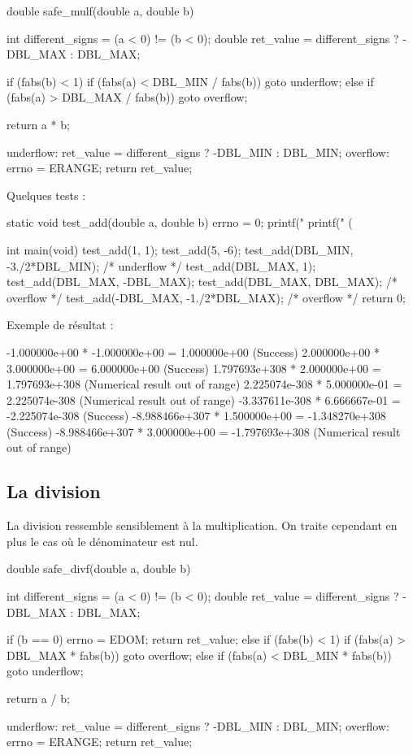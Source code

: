 \begin{C}
double safe_mulf(double a, double b)
{
    int different_signs = (a < 0) != (b < 0);
    double ret_value = different_signs ? -DBL_MAX : DBL_MAX;

    if (fabs(b) < 1) 
    {
        if (fabs(a) < DBL_MIN / fabs(b))
            goto underflow;
    }
    else
    {
        if (fabs(a) > DBL_MAX / fabs(b))
            goto overflow;
    }   

    return a * b;

underflow:
    ret_value = different_signs ? -DBL_MIN : DBL_MIN;
overflow:
    errno = ERANGE;
    return ret_value;
}
\end{C}

Quelques tests :

\begin{C}
static void test_add(double a, double b)
{
    errno = 0;
    printf("%
    printf(" (%
}

int main(void)
{
    test_add(1, 1);
    test_add(5, -6);
    test_add(DBL_MIN, -3./2*DBL_MIN); /* underflow */
    test_add(DBL_MAX, 1);
    test_add(DBL_MAX, -DBL_MAX);
    test_add(DBL_MAX, DBL_MAX); /* overflow */
    test_add(-DBL_MAX, -1./2*DBL_MAX); /* overflow */
    return 0;
}
\end{C}

Exemple de résultat :

\begin{C}
-1.000000e+00 * -1.000000e+00 = 1.000000e+00 (Success)
2.000000e+00 * 3.000000e+00 = 6.000000e+00 (Success)
1.797693e+308 * 2.000000e+00 = 1.797693e+308 (Numerical result out of range)
2.225074e-308 * 5.000000e-01 = 2.225074e-308 (Numerical result out of range)
-3.337611e-308 * 6.666667e-01 = -2.225074e-308 (Success)
-8.988466e+307 * 1.500000e+00 = -1.348270e+308 (Success)
-8.988466e+307 * 3.000000e+00 = -1.797693e+308 (Numerical result out of range)
\end{C}

\subsection{La division}
\label{la-division}

La division ressemble sensiblement à la multiplication. On traite
cependant en plus le cas où le dénominateur est nul.

\begin{C}
double safe_divf(double a, double b)
{
    int different_signs = (a < 0) != (b < 0);
    double ret_value = different_signs ? -DBL_MAX : DBL_MAX;

    if (b == 0)
    {
        errno = EDOM;
        return ret_value;   
    }
    else if (fabs(b) < 1)
    {
        if (fabs(a) > DBL_MAX * fabs(b))
            goto overflow;
    }
    else
    {
        if (fabs(a) < DBL_MIN * fabs(b))
            goto underflow;
    }

    return a / b;

underflow:
    ret_value = different_signs ? -DBL_MIN : DBL_MIN;
overflow:
    errno = ERANGE;
    return ret_value;
}
\end{C}

